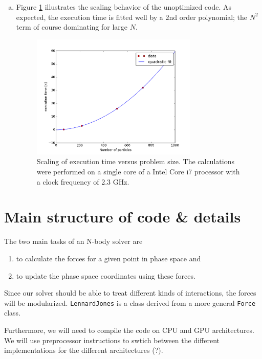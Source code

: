\documentclass{scrartcl}
\begin{document}
\begin{enumerate}[a)]
\item Figure \ref{fig:scal} illustrates the scaling behavior of the unoptimized
    code. As expected, the execution time is fitted well by a 2nd order 
    polynomial; the $N^2$ term of course dominating for large $N$.
\begin{figure}[h]
    \centering
    \includegraphics[width=0.75\textwidth]{images/scaling}
    \caption{Scaling of execution time versus problem size. 
             The calculations were performed on a single core of a Intel Core i7 
    processor with a clock frequency of 2.3 GHz.}
    \label{fig:scal}
\end{figure}

\end{enumerate}


\section{Main structure of code \& details}

The two main tasks of an N-body solver are
\begin{enumerate}
    \item to calculate the forces for a given point in phase space and 
    \item to update the phase space coordinates using these forces.
\end{enumerate}

Since our solver should be able to treat different kinds of interactions,
the forces will be modularized. \verb|LennardJones| is a class derived
from a more general \verb|Force|  class.

Furthermore, we will need to compile the code on CPU and GPU architectures. 
We will use preprocessor instructions to swtich between the different
implementations for the different architectures (?).
\end{document}
